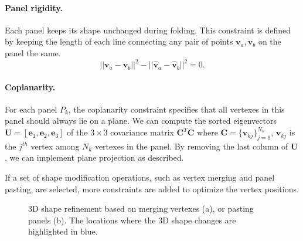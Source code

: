 \paragraph{Panel rigidity.} 
Each panel keeps its shape unchanged during folding. This constraint is defined by keeping the length of each line connecting any pair of points $\mathbf{v}_{a}, \mathbf{v}_{b}$ on the panel the same.
\begin{equation}
||\mathbf{v}_{a} - \mathbf{v}_{b}||^2 - ||\hat{\mathbf{v}}_{a} - \hat{\mathbf{v}}_{b}||^2 = 0.
\label{equ:plane}
\end{equation}




\paragraph{Coplanarity.} {For each panel $P_{k}$, the coplanarity constraint specifies that all vertexes in this panel should always lie on a plane. 
We can compute the sorted eigenvectors $\mathbf{U} = [\mathbf{e}_1, \mathbf{e}_2, \mathbf{e}_3]$ of the $ 3 \times 3$ covariance matrix $\mathbf{C}^T\mathbf{C}$ where $\mathbf{C} = \{\mathbf{v}_{kj}\}_{j=1}^{N_k}$, $\mathbf{v}_{kj}$ is the $j^{th}$ vertex among $N_k$ vertexes in the panel. By removing the last column of $\mathbf{U}$, we can implement plane projection as \cite{Bouaziz:2012:SSD:2346796.2346802} described.


If a set of shape modification operations, such as vertex merging and panel pasting, are selected, more constraints are added to optimize the vertex positions. 
%

\begin{figure}
	\centering
	\hfill
	\caption{3D shape refinement based on merging vertexes (a), or pasting panels (b). The locations where the 3D shape changes are highlighted in blue.  }
	\label{fig:shaperefinement}
\end{figure}

}
